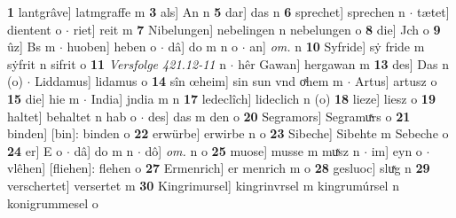 \documentclass[8pt,a4paper,notitlepage]{article}
\begin{document}
\begin{table}[ht]
\begin{minipage}[t]{0.5\linewidth}
\textbf{1} lantgrâve] latmgraffe m \textbf{3} als] An n \textbf{5} dar] das n \textbf{6} sprechet] sprechen n  $\cdot$ tætet] dientent o  $\cdot$ riet] reit m \textbf{7} Nibelungen] nebelingen n nebelungen o \textbf{8} die] Jch o \textbf{9} ûz] Bs m  $\cdot$ huoben] heben o  $\cdot$ dâ] do m n o  $\cdot$ an] \textit{om.} n \textbf{10} Syfride] sẏ fride m sẏfrit n sifrit o \textbf{11} \textit{Versfolge 421.12-11} n   $\cdot$ hêr Gawan] hergawan m \textbf{13} des] Das n (o)  $\cdot$ Liddamus] lidamus o \textbf{14} sîn œheim] sin sun vnd oͯhem m  $\cdot$ Artus] artusz o \textbf{15} die] hie m  $\cdot$ India] jndia m n \textbf{17} ledeclîch] lideclich n (o) \textbf{18} lieze] liesz o \textbf{19} haltet] behaltet n hab o  $\cdot$ des] das m den o \textbf{20} Segramors] Segramuͯrs o \textbf{21} binden] [bin]: binden o \textbf{22} erwürbe] erwirbe n o \textbf{23} Sibeche] Sibehte m Sebeche o \textbf{24} er] E o  $\cdot$ dâ] do m n  $\cdot$ dô] \textit{om.} n o \textbf{25} muose] musse m muͯsz n  $\cdot$ im] eyn o  $\cdot$ vlêhen] [fliehen]: flehen o \textbf{27} Ermenrich] er menrich m o \textbf{28} gesluoc] sluͯg n \textbf{29} verschertet] versertet m \textbf{30} Kingrimursel] kingrinvrsel m kingrumúrsel n konigrummesel o \newline
\end{minipage}
\end{table}
\newpage
\end{document}
